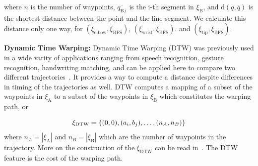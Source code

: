 \documentclass[letterpaper, 10 pt, conference]{ieeeconf}  %
\newcommand{\tj}[1]{\ensuremath{\xi_\text{#1}}}
\begin{document}
where $n$ is the number of waypoints, $\overline{q_\text{B,i}}$ is the i-th segment in \tj{B}, and $\text{d}(q, \overline{q})$ is the shortest distance between the point and the line segment. We calculate this distance only one way, for $(\tj{elbow},\tj{BFS})$, $(\tj{wrist},\tj{BFS})$. and $(\tj{tip},\tj{BFS})$.

{\bf Dynamic Time Warping:} Dynamic Time Warping (DTW) was previously used in a wide varity of applications ranging from speech recognition, gesture recognition, handwriting matching, and can be applied here to compare two different trajectories~\cite{senin2008dynamic}\cite{chen2013dynamic}. It provides a way to compute a distance despite differences in timing of the trajectories as well. DTW computes a mapping of a subset of the waypoints in $\xi_\text{A}$ to a subset of the waypoints in $\xi_\text{B}$ which constitutes the warping path, or

\begin{equation}
\xi_\text{DTW} = \{ (0, 0), (a_i, b_j), \mathellipsis ,(n_A, n_B) \}
\end{equation} where $n_A = |\tj{A}|$ and $n_B = |\tj{B}|$ which are the number of waypoints in the trajectory. More on the construction of the \tj{DTW} can be read in~\cite{senin2008dynamic}\cite{chen2013dynamic}. The DTW feature is the cost of the warping path.
\end{document}
